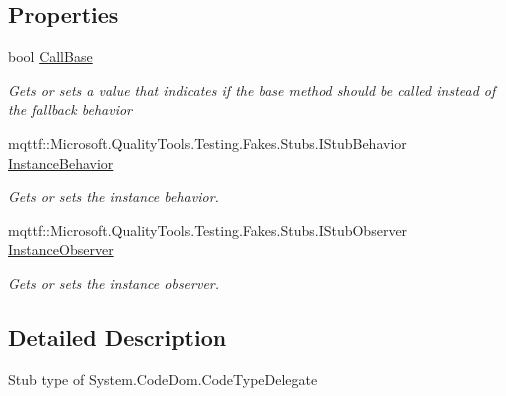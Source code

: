 \subsection*{Properties}
\begin{DoxyCompactItemize}
\item 
bool \hyperlink{class_system_1_1_code_dom_1_1_fakes_1_1_stub_code_type_delegate_a4370d2f57f76a34e8824d34c1316a4d0}{Call\-Base}
\begin{DoxyCompactList}\small\item\em Gets or sets a value that indicates if the base method should be called instead of the fallback behavior\end{DoxyCompactList}\item 
mqttf\-::\-Microsoft.\-Quality\-Tools.\-Testing.\-Fakes.\-Stubs.\-I\-Stub\-Behavior \hyperlink{class_system_1_1_code_dom_1_1_fakes_1_1_stub_code_type_delegate_a6db5f59fc2e9ba84e0c86241d4c31b9d}{Instance\-Behavior}
\begin{DoxyCompactList}\small\item\em Gets or sets the instance behavior.\end{DoxyCompactList}\item 
mqttf\-::\-Microsoft.\-Quality\-Tools.\-Testing.\-Fakes.\-Stubs.\-I\-Stub\-Observer \hyperlink{class_system_1_1_code_dom_1_1_fakes_1_1_stub_code_type_delegate_ad79455bb0e351b0034ba188ee2365abc}{Instance\-Observer}
\begin{DoxyCompactList}\small\item\em Gets or sets the instance observer.\end{DoxyCompactList}\end{DoxyCompactItemize}


\subsection{Detailed Description}
Stub type of System.\-Code\-Dom.\-Code\-Type\-Delegate



